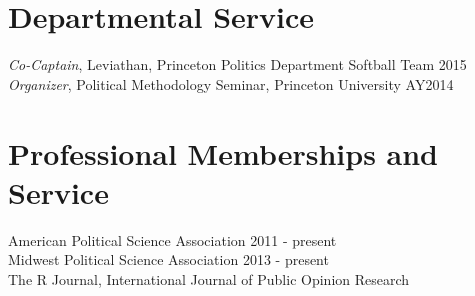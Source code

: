 \documentclass[]{deedy-resume-openfont}
\begin{document}
\section{Departmental Service}
{\it Co-Captain}, Leviathan, Princeton Politics Department Softball Team \hfill 2015\\
{\it Organizer}, Political Methodology Seminar, Princeton University \hfill AY2014\\
\sectionsep

\section{Professional Memberships and Service}
American Political Science Association \hfill 2011 - present\\
Midwest Political Science Association \hfill 2013 - present\\
 The \textsf{R} Journal, International Journal of Public Opinion Research\\
\sectionsep
\end{document}
